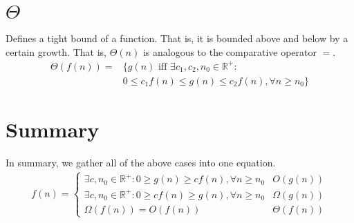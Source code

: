 \section{$\Theta$}
\label{ch:asymptoticnotation|sec:theta}
Defines a tight bound of a function. That is, it is bounded above and below by
a certain growth. That is, $\Theta(n)$ is analogous to the comparative
operator $=$.
\begin{align}
	\Theta(f(n)) =
	&\{g(n) \text{ iff } \exists c_1, c_2, n_0 \in \mathbb{R}^{+} :\\
	&0 \leq c_1 f(n) \leq g(n) \leq c_2 f(n), \forall n \geq n_0 \}
	\nonumber
\end{align}

\section{Summary}
\label{ch:asymptoticnotation|sec:summary}
In summary, we gather all of the above cases into one equation.
\begin{align}
	f(n) =
	\begin{cases}
		\exists c, n_0 \in \mathbb{R}^{+}
		: 0 \geq g(n) \geq c f(n), \forall n \geq n_0 & O(g(n)) \\
		\exists c, n_0 \in \mathbb{R}^{+}
		: 0 \geq c f(n) \geq g(n), \forall n \geq n_0 & \Omega(g(n)) \\
		\Omega(f(n)) = O(f(n)) & \Theta(f(n))
	\end{cases}
\end{align}


